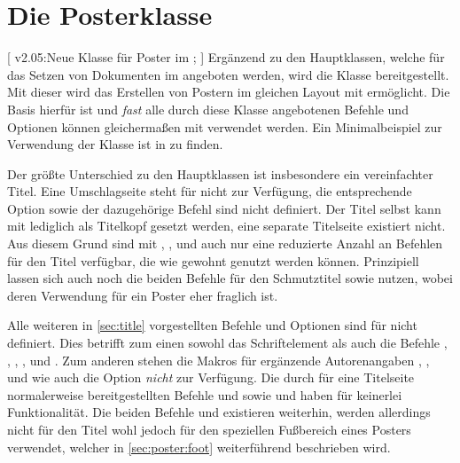 \chapter[%
  Die Posterklasse \ClassRaw{tudscrposter}{\BooleanFalse}%
]{%
  Die Posterklasse%
}

\begin{DeclareEntity}{}
[
  v2.05:Neue Klasse für Poster im \TUDCD;
]
Ergänzend zu den Hauptklassen, welche für das Setzen von Dokumenten im \TUDCD 
angeboten werden, wird die Klasse  bereitgestellt. Mit 
dieser wird das Erstellen von Postern im gleichen Layout mit  
ermöglicht. Die Basis hierfür ist  und \emph{fast} alle 
durch diese Klasse angebotenen Befehle und Optionen können gleichermaßen mit 
 verwendet werden. Ein Minimalbeispiel zur Verwendung der 
Klasse ist in  zu finden.

Der größte Unterschied zu den Hauptklassen ist insbesondere ein vereinfachter 
Titel. Eine Umschlagseite steht für  nicht zur Verfügung, 
die entsprechende Option  sowie der dazugehörige Befehl 
 sind nicht definiert. Der Titel selbst kann mit 
 lediglich als Titelkopf gesetzt werden, eine separate 
Titelseite existiert nicht. Aus diesem Grund sind mit , 
,  und  
auch nur eine reduzierte Anzahl an Befehlen für den Titel verfügbar, die wie 
gewohnt genutzt werden können. Prinzipiell lassen sich auch noch die beiden 
Befehle für den Schmutztitel  sowie  
nutzen, wobei deren Verwendung für ein Poster eher fraglich ist.

Alle weiteren in \autoref{sec:title} vorgestellten Befehle und Optionen sind 
für  nicht definiert. Dies betrifft zum einen sowohl das 
Schriftelement  als auch die Befehle , 
, , ,  und 
. Zum anderen stehen die Makros für ergänzende 
Autorenangaben , , 
 und  wie auch 
die Option  \emph{nicht} zur Verfügung. Die durch 
\KOMAScript für eine Titelseite normalerweise bereitgestellten Befehle 
 und  sowie  und 
haben für  keinerlei Funktionalität. Die beiden Befehle 
 und  existieren weiterhin, werden allerdings 
nicht für den Titel wohl jedoch für den speziellen Fußbereich eines Posters 
verwendet, welcher in \autoref{sec:poster:foot} weiterführend beschrieben wird.


\end{DeclareEntity}
